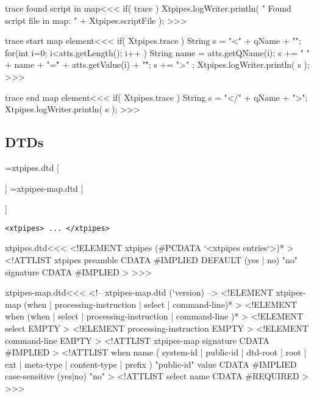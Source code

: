 \documentclass{article}
\begin{document}
{\<trace found script in map\><<<
if( trace ){
   Xtpipes.logWriter.println( " Found script file in map: "
                                + Xtpipes.scriptFile );
}
>>>


\<trace start map element\><<< 
if( Xtpipes.trace ){
   String s =  "<" + qName + "\n";
   for(int i=0; i<atts.getLength(); i++ ){
      String name = atts.getQName(i);
      s += " " + name + "=\"" + atts.getValue(i) + "\"";
   } 
   s += ">" ;
   Xtpipes.logWriter.println( s );
}
>>>

\<trace end map element\><<<
if( Xtpipes.trace ){
   String s =  "</" + qName + ">";
   Xtpipes.logWriter.println( s );
}
>>>



\subsection{DTDs}



\immediate{}=xtpipes.dtd
 \else
   \immediate{}
   [
     
   \EndHPage{}]
\fi
%
\immediate{}=xtpipes-map.dtd
 \else
   \immediate{}
   [
     
   \EndHPage{}]
\fi

\begin{verbatim}
<xtpipes> ... </xtpipes>
\end{verbatim}

\<xtpipes.dtd\><<<
<!ELEMENT xtpipes (#PCDATA `<xtpipes entries`>)* >  
<!ATTLIST xtpipes
          preamble  CDATA #IMPLIED DEFAULT (yes | no) "no" 
          signature CDATA #IMPLIED                         >
>>>




\expandafter\AddFile{}
 
  
\<xtpipes-map.dtd\><<<  
<!-- xtpipes-map.dtd (`version) -->  
<!ELEMENT xtpipes-map (when | processing-instruction  
                            | select
                            | command-line)*  >  
<!ELEMENT when (when | select
                     | processing-instruction  
                     | command-line )*  >  
<!ELEMENT select EMPTY >  
<!ELEMENT processing-instruction EMPTY >  
<!ELEMENT command-line EMPTY >  
<!ATTLIST xtpipes-map
          signature      CDATA #IMPLIED  
>  
<!ATTLIST when  
          name   (
                    system-id                                 
                  | public-id   
                  | dtd-root     
                  | root        
                  | ext         
                  | meta-type        
                  | content-type 
                  | prefix      )  "public-id"
          value   CDATA #IMPLIED  
          case-sensitive (yes|no) "no"  
>  
<!ATTLIST select  
          name      CDATA #REQUIRED  
>  
>>>  


}
\end{document}
